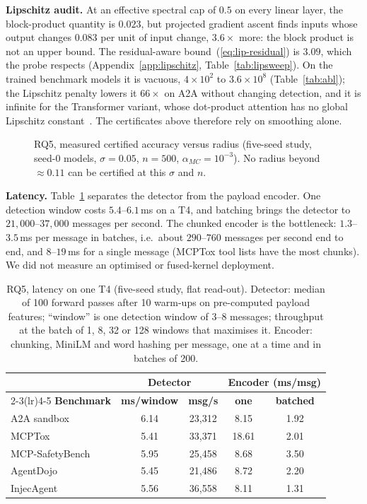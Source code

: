\documentclass[conference,compsoc]{IEEEtran}
\begin{document}
\textbf{Lipschitz audit.} At an effective spectral cap of $0.5$ on every linear layer, the block-product quantity is $0.023$, but projected gradient ascent finds inputs whose output changes $0.083$ per unit of input change, $3.6\times$ more: the block product is not an upper bound. The residual-aware bound~(\ref{eq:lip-residual}) is $3.09$, which the probe respects (Appendix~\ref{app:lipschitz}, Table~\ref{tab:lipsweep}). On the trained benchmark models it is vacuous, $4\times10^{2}$ to $3.6\times10^{8}$ (Table~\ref{tab:abl}); the Lipschitz penalty lowers it $66\times$ on A2A without changing detection, and it is infinite for the Transformer variant, whose dot-product attention has no global Lipschitz constant~\cite{Kim2021LipAttn}. The certificates above therefore rely on smoothing alone.

\begin{figure}[!t]
\centering

\caption{RQ5, measured certified accuracy versus radius (five-seed study, seed-0 models, $\sigma=0.05$, $n=500$, $\alpha_{MC}=10^{-3}$). No radius beyond $\approx0.11$ can be certified at this $\sigma$ and $n$.}
\label{fig:cert-curves}
\end{figure}

\textbf{Latency.} Table~\ref{tab:latency} separates the detector from the payload encoder. One detection window costs $5.4$--$6.1$\,ms on a T4, and batching brings the detector to $21{,}000$--$37{,}000$ messages per second. The chunked encoder is the bottleneck: $1.3$--$3.5$\,ms per message in batches, i.e.\ about $290$--$760$ messages per second end to end, and $8$--$19$\,ms for a single message (MCPTox tool lists have the most chunks). We did not measure an optimised or fused-kernel deployment.

\begin{table}[!t]
\centering
\caption{RQ5, latency on one T4 (five-seed study, flat read-out). Detector: median of 100 forward passes after 10 warm-ups on pre-computed payload features; ``window'' is one detection window of 3--8 messages; throughput at the batch of 1, 8, 32 or 128 windows that maximises it. Encoder: chunking, MiniLM and word hashing per message, one at a time and in batches of 200.}
\label{tab:latency}
\footnotesize
\renewcommand{\arraystretch}{1.1}
\setlength{\tabcolsep}{3pt}
\begin{tabular}{@{}lcccc@{}}
\toprule
 & \multicolumn{2}{c}{\textbf{Detector}} & \multicolumn{2}{c}{\textbf{Encoder (ms/msg)}} \\
\cmidrule(lr){2-3}\cmidrule(lr){4-5}
\textbf{Benchmark} & \textbf{ms/window} & \textbf{msg/s} & \textbf{one} & \textbf{batched} \\
\midrule
A2A sandbox     & 6.14 & 23{,}312 & 8.15  & 1.92 \\
MCPTox          & 5.41 & 33{,}371 & 18.61 & 2.01 \\
MCP-SafetyBench & 5.95 & 25{,}458 & 8.68  & 3.50 \\
AgentDojo       & 5.45 & 21{,}486 & 8.72  & 2.20 \\
InjecAgent      & 5.56 & 36{,}558 & 8.11  & 1.31 \\
\bottomrule
\end{tabular}
\end{table}
\end{document}
